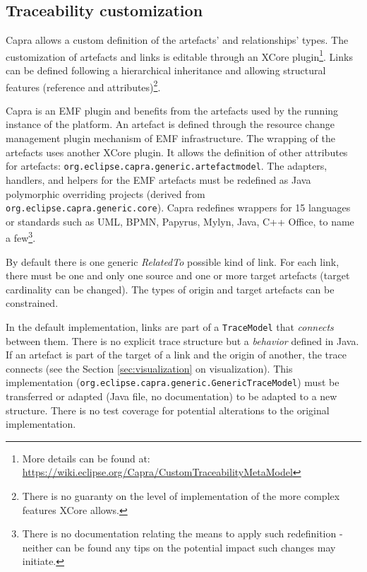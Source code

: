 \subsection{Traceability customization}\label{sec:custom}

Capra allows a custom definition of the artefacts' and relationships' types. The customization of artefacts and links is editable through an XCore plugin\footnote{More details can be found at: \url{https://wiki.eclipse.org/Capra/CustomTraceabilityMetaModel}}. Links can be defined following a hierarchical inheritance and allowing structural features (reference and attributes)\footnote{There is no guaranty on the level of implementation of the more complex features XCore allows.}. 

Capra is an EMF plugin and benefits from the artefacts used by the running instance of the platform. An artefact is defined through the resource change management plugin mechanism of EMF infrastructure. The wrapping of the artefacts uses another XCore plugin. It allows the definition of other attributes for artefacts: \verb|org.eclipse.capra.generic.artefactmodel|.
The adapters, handlers, and helpers for the EMF artefacts must be redefined as Java polymorphic overriding projects (derived from \verb|org.eclipse.capra.generic.core|).  
Capra redefines wrappers for 15 languages or standards such as UML, BPMN, Papyrus, Mylyn, Java, C++ Office, to name a few\footnote{There is no documentation relating the means to apply such redefinition - neither can be found any tips on the potential impact such changes may initiate.}. 

By default there is one generic \textit{RelatedTo} possible kind of link. For each link, there must be one and only one source and one or more target artefacts (target cardinality can be changed). The types of origin and target artefacts can be constrained.

In the default implementation, links are part of a \texttt{TraceModel} that \textit{connects} between them. There is no explicit trace structure but a \textit{behavior} defined in Java. 
If an artefact is part of the target of a link and the origin of another, the trace connects (see the Section \ref{sec:visualization} on visualization). This implementation (\verb|org.eclipse.capra.generic.GenericTraceModel|) must be transferred or adapted (Java file, no documentation) to be adapted to a new structure. There is no test coverage for potential alterations to the original implementation. 

